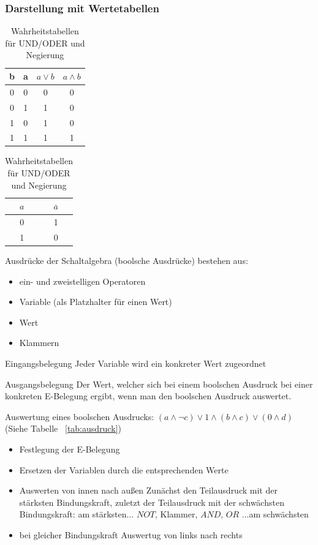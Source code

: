 \documentclass[10pt,a4paper]{scrartcl}
\newcommand{\reftbl}[1]{Tabelle ~\ref{#1}}
\begin{document}
\subsubsection{Darstellung mit Wertetabellen}
\begin{table}[h]
	\centering
	\begin{minipage}[b]{0.4\textwidth}
		\centering
		\begin{tabular}{cc|c|c}
			b & a & $a \vee b$ & $a \wedge b$\\ \hline
			0 & 0 & 0 & 0\\
			0 & 1 & 1 & 0\\
			1 & 0 & 1 & 0\\
			1 & 1 & 1 & 1\\
		\end{tabular}
	\end{minipage}
	\begin{minipage}[b]{0.4\textwidth}
		\centering
		\begin{tabular}{c|c}
			$a$ & $\overline{a}$\\ \hline
			0 & 1\\
			1 & 0\\
		\end{tabular}
	\end{minipage}	
	\caption{Wahrheitstabellen für UND/ODER und Negierung}
\end{table}

Ausdrücke der Schaltalgebra (\glqq boolsche Ausdrücke\grqq) bestehen aus:
\begin{itemize}
	\item ein- und zweistelligen Operatoren
	\item Variable (als Platzhalter für einen Wert)
	\item Wert
	\item Klammern
\end{itemize}
\begin{Theorem}{Eingangsbelegung}{}
	Jeder Variable wird ein konkreter Wert zugeordnet
\end{Theorem}
\begin{Theorem}{Ausgangsbelegung}{}
	Der Wert, welcher sich bei einem boolschen Ausdruck bei einer konkreten E-Belegung ergibt, wenn man den boolschen Ausdruck \glqq auswertet\grqq.
\end{Theorem}

Auswertung eines boolschen Ausdrucks: $(a \wedge \neg c) \vee 1 \wedge(b \wedge c) \vee (0 \wedge d)$ (Siehe \reftbl{tab:ausdruck})
\begin{itemize}
	\item Festlegung der E-Belegung
	\item Ersetzen der Variablen durch die entsprechenden Werte
	\item Auswerten \glqq von innen nach außen\grqq
	\subitem Zunächst den Teilausdruck mit der stärksten Bindungskraft, zuletzt der Teilausdruck mit der schwächsten\\ Bindungskraft: am stärksten... $NOT$, Klammer, $AND$, $OR$ ...am schwächsten
	\item bei gleicher Bindungskraft Auswertug von links nach rechts
\end{itemize}
\end{document}
